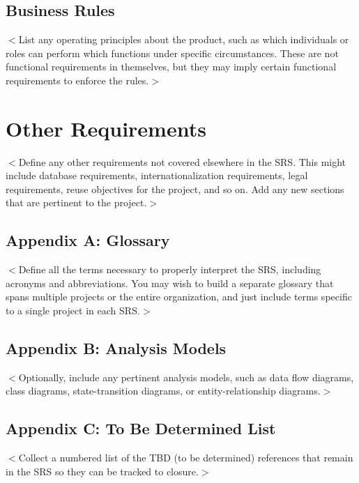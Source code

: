 \documentclass{scrreprt}
\begin{document}
\begin{CJK}{UTF8}{bkai}
\section{Business Rules}
$<$List any operating principles about the product, such as which individuals or 
roles can perform which functions under specific circumstances. These are not 
functional requirements in themselves, but they may imply certain functional 
requirements to enforce the rules.$>$


\chapter{Other Requirements}
$<$Define any other requirements not covered elsewhere in the SRS. This might 
include database requirements, internationalization requirements, legal 
requirements, reuse objectives for the project, and so on. Add any new sections 
that are pertinent to the project.$>$

\section{Appendix A: Glossary}
$<$Define all the terms necessary to properly interpret the SRS, including 
acronyms and abbreviations. You may wish to build a separate glossary that spans 
multiple projects or the entire organization, and just include terms specific to 
a single project in each SRS.$>$

\section{Appendix B: Analysis Models}
$<$Optionally, include any pertinent analysis models, such as data flow 
diagrams, class diagrams, state-transition diagrams, or entity-relationship 
diagrams.$>$

\section{Appendix C: To Be Determined List}
$<$Collect a numbered list of the TBD (to be determined) references that remain 
in the SRS so they can be tracked to closure.$>$

\end{CJK}
\end{document}
